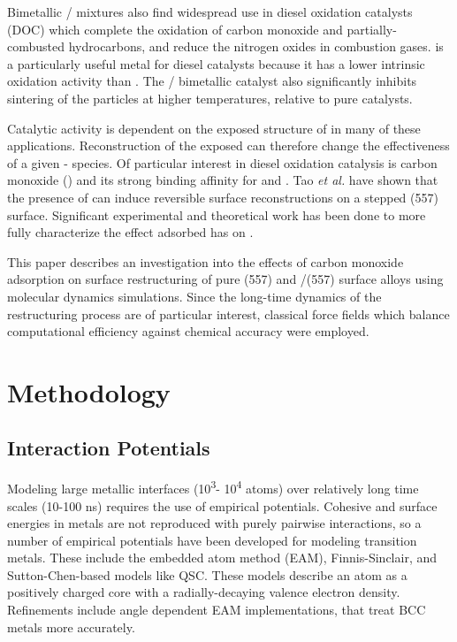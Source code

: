 \documentclass[journal = jpccck, manuscript = article]{achemso}
\begin{document}
Bimetallic / mixtures also find widespread use in diesel
oxidation catalysts (DOC) which complete the oxidation of carbon
monoxide and partially-combusted hydrocarbons, and reduce the nitrogen
oxides in combustion gases.\cite{Morlang:2005uq,Russell:2011fk}
 is a particularly useful metal for diesel catalysts because it
has a lower intrinsic  oxidation activity than
.\cite{Russell:2011fk} The / bimetallic catalyst
also significantly inhibits sintering of the particles at higher
temperatures, relative to pure  catalysts.\cite{Morlang:2005uq}

Catalytic activity is dependent on the exposed structure of  in
many of these applications. Reconstruction of the exposed  can
therefore change the effectiveness of a given - species.
Of particular interest in diesel oxidation catalysis is carbon
monoxide () and its strong binding affinity for  and
. Tao \textit{et al.} have shown that the presence of 
can induce reversible surface reconstructions on a stepped
(557) surface.\cite{Tao:2010} Significant experimental and
theoretical work has been done to more fully characterize the effect
adsorbed  has on
.\cite{Batteas:1996rc,Thostrup:2001dn,McCarthy:2012qd,Michalka:2013,Carenco:2014}

This paper describes an investigation into the effects of carbon
monoxide adsorption on surface restructuring of pure (557) and
/(557) surface alloys using molecular dynamics
simulations. Since the long-time dynamics of the restructuring process
are of particular interest, classical force fields which balance
computational efficiency against chemical accuracy were employed.

\section{Methodology}
\subsection{Interaction Potentials}

Modeling large metallic interfaces (10\textsuperscript{3}-
10\textsuperscript{4} atoms) over relatively long time scales (10-100
ns) requires the use of empirical potentials. Cohesive and surface
energies in metals are not reproduced with purely pairwise
interactions, so a number of empirical potentials have been developed
for modeling transition metals.  These include the embedded atom
method (EAM)\cite{EAM}, Finnis-Sinclair,\cite{Finnis84} and
Sutton-Chen-based models like QSC.\cite{QSC} These models describe an
atom as a positively charged core with a radially-decaying valence
electron density.  Refinements include angle dependent EAM
implementations,\cite{Baskes:1987} that treat BCC metals more
accurately.
\end{document}
